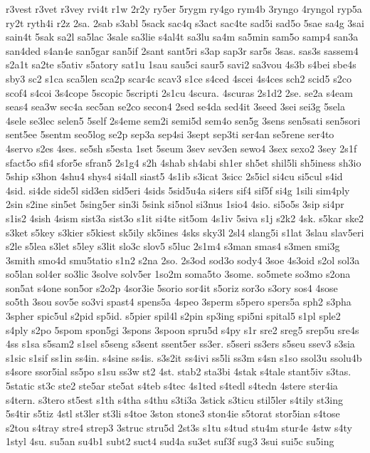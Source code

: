 {r3vest
r3vet
r3vey
rvi4t
r1w
2r2y
ry5er
5rygm
ry4go
rym4b
3ryngo
4ryngol
ryp5a
ry2t
ryth4i
r2z
2sa.
2sab
s3abl
5sack
sac4q
s3act
sac4te
sad5i
sad5o
5sae
sa4g
3sai
sain4t
5sak
sa2l
sa5lac
3sale
sa3lie
s4al4t
sa3lu
sa4m
sa5min
sam5o
samp4
san3a
san4ded
s4an4e
san5gar
san5if
2sant
sant5ri
s3ap
sap3r
sar5s
3sas.
sas3s
sassem4
s2a1t
sa2te
s5ativ
s5atory
sat1u
1sau
sau5ci
saur5
savi2
sa3vou
4s3b
s4bei
sbe4s
sby3
sc2
s1ca
sca5len
sca2p
scar4c
scav3
s1ce
s4ced
4scei
4s4ces
sch2
scid5
s2co
scof4
s4coi
3s4cope
5scopic
5scripti
2s1cu
4scura.
4scuras
2s1d2
2se.
se2a
s4eam
seas4
sea3w
sec4a
sec5an
se2co
secon4
2sed
se4da
sed4it
3seed
3sei
sei3g
5sela
4sele
se3lec
selen5
5self
2s4eme
sem2i
semi5d
sem4o
sen5g
3sens
sen5sati
sen5sori
sent5ee
5sentm
seo5log
se2p
sep3a
sep4si
3sept
sep3ti
ser4an
se5rene
ser4to
4servo
s2es
4ses.
se5sh
s5esta
1set
5seum
3sev
sev3en
sewo4
3sex
sexo2
3sey
2s1f
sfact5o
sfi4
sfor5e
sfran5
2s1g4
s2h
4shab
sh4abi
sh1er
sh5et
shil5li
sh5iness
sh3io
5ship
s3hon
4shu4
shys4
si4all
siast5
4s1ib
s3icat
3sicc
2s5icl
si4cu
si5cul
s4id
4sid.
si4de
side5l
sid3en
sid5eri
4sids
5sid5u4a
si4ers
sif4
sif5f
si4g
1sili
sim4ply
2sin
s2ine
sin5et
5sing5er
sin3i
5sink
si5nol
si3nus
1sio4
4sio.
si5o5s
3sip
si4pr
s1is2
4sish
4sism
sist3a
sist3o
s1it
si4te
sit5om
4s1iv
5siva
s1j
s2k2
4sk.
s5kar
ske2
s3ket
s5key
s3kier
s5kiest
sk5ily
sk5ines
4sks
sky3l
2sl4
slang5i
s1lat
3slau
slav5eri
s2le
s5lea
s3let
s5ley
s3lit
slo3c
slov5
s5luc
2s1m4
s3man
smas4
s3men
smi3g
3smith
smo4d
smu5tatio
s1n2
s2na
2so.
2s3od
sod3o
sody4
3soe
4s3oid
s2ol
sol3a
so5lan
sol4er
so3lic
3solve
solv5er
1so2m
soma5to
3some.
so5mete
so3mo
s2ona
son5at
s4one
son5or
s2o2p
4sor3ie
5sorio
sor4it
s5oriz
sor3o
s3ory
sos4
4sose
so5th
3sou
sov5e
so3vi
spast4
spens5a
4speo
3sperm
s5pero
spers5a
sph2
s3pha
3spher
spic5ul
s2pid
sp5id.
s5pier
spil4l
s2pin
sp3ing
spi5ni
spital5
s1pl
sple2
s4ply
s2po
5spom
spon5gi
3spons
3spoon
spru5d
s4py
s1r
sre2
sreg5
srep5u
sre4s
4ss
s1sa
s5sam2
s1sel
s5seng
s3sent
ssent5er
ss3er.
s5seri
ss3ers
s5seu
ssev3
s3sia
s1sic
s1sif
ss1in
ss4in.
s4sine
ss4is.
s3s2it
ss4ivi
ss5li
ss3m
s4sn
s1so
ssol3u
ssolu4b
s4sore
ssor5ial
ss5po
s1su
ss3w
st2
4st.
stab2
sta3bi
4stak
s4tale
stant5iv
s3tas.
5static
st3c
ste2
ste5ar
ste5at
s4teb
s4tec
4s1ted
s4tedl
s4tedn
4stere
ster4ia
s4tern.
s3tero
st5est
s1th
s4tha
s4thu
s3ti3a
3stick
s3ticu
stil5ler
s4tily
st3ing
5s4tir
s5tiz
4stl
st3ler
st3li
s4toe
3ston
stone3
ston4ie
s5torat
stor5ian
s4tose
s2tou
s4tray
stre4
strep3
3struc
stru5d
2st3s
s1tu
s4tud
stu4m
stur4e
4stw
s4ty
1styl
4su.
su5an
su4b1
subt2
suct4
sud4a
su3et
suf3f
sug3
3sui
sui5c
su5ing
}
